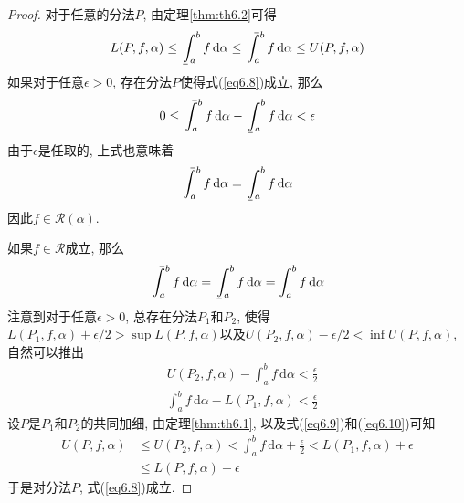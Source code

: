 \documentclass[cn,12pt,math=mtpro2,citestyle=gb7714-2015,bibstyle=gb7714-2015,twocol]{elegantbook}
\newcommand{\da}{\,\text{d}\alpha}
\def\upint{\mathchoice%
    {\mkern13mu\overline{\vphantom{\intop}\mkern7mu}\mkern-20mu}%
    {\mkern7mu\overline{\vphantom{\intop}\mkern7mu}\mkern-14mu}%
    {\mkern7mu\overline{\vphantom{\intop}\mkern7mu}\mkern-14mu}%
    {\mkern7mu\overline{\vphantom{\intop}\mkern7mu}\mkern-14mu}%
  \int}
\def\lowint{\mkern3mu\underline{\vphantom{\intop}\mkern7mu}\mkern-10mu\int}
\begin{document}
\begin{proof}
  对于任意的分法$P$, 由定理\ref{thm:th6.2}可得
  $$L(P,f,\alpha)\leq \lowint_a^b f\da\leq\upint_a^b f\da\leq U(P,f,\alpha)$$
  如果对于任意$\epsilon>0$, 存在分法$P$使得式(\ref{eq6.8})成立, 那么
  $$0\leq \upint_a^b f\da-\lowint_a^b f\da<\epsilon $$
  由于$\epsilon$是任取的, 上式也意味着
  $$\upint_a^b f\da=\lowint_a^b f\da$$
  因此$f\in\mathscr{R}(\alpha)$.

  如果$f\in\mathscr{R}$成立, 那么
  $$\displaystyle \upint_a^b f\da=\lowint_a^b f\da=\int_a^b f\da$$
  注意到对于任意$\epsilon>0$, 总存在分法$P_1$和$P_2$, 使得$\displaystyle L(P_1,f,\alpha)+\epsilon/2>\sup L(P,f,\alpha)$以及$U(P_2,f,\alpha)-\epsilon/2<\inf U(P,f,\alpha)$, 自然可以推出
  \begin{align}
  &U(P_2,f,\alpha)-\int_a^b f\da<\frac{\epsilon}{2} \label{eq6.9} \\
  &\int_a^b f\da-L(P_1,f,\alpha)<\frac{\epsilon}{2} \label{eq6.10}
  \end{align}
  设$P$是$P_1$和$P_2$的共同加细, 由定理\ref{thm:th6.1}, 以及式(\ref{eq6.9})和(\ref{eq6.10})可知
  \begin{align*}
  U(P,f,\alpha)&\leq U(P_2,f,\alpha)<\int_a^b f\da+\frac{\epsilon}{2}<L(P_1,f,\alpha)+\epsilon
   \\
  &\leq L(P,f,\alpha)+\epsilon
  \end{align*}
  于是对分法$P$, 式(\ref{eq6.8})成立.


\end{proof}
\end{document}
